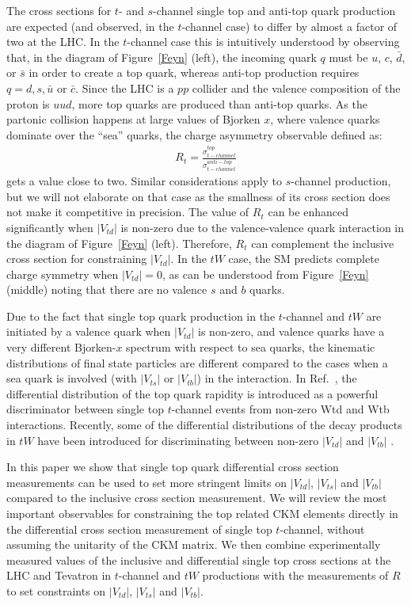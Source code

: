 \documentclass[11pt]{article}
\newcommand{\VTD}{|V_{td}|}
\newcommand{\VTS}{|V_{ts}|}
\newcommand{\VTB}{|V_{tb}|}
\begin{document}
The  cross sections for $t$- and $s$-channel single top and anti-top quark production are expected (and observed, in the $t$-channel case) to differ by almost a factor of two at the LHC.
In the $t$-channel case this is intuitively understood by observing that, in the diagram of Figure~\ref{Feyn} (left), the incoming  quark $q$ must be $u$, $c$, $\bar{d}$, or $\bar{s}$  in order to create a top quark, whereas anti-top  production requires $q = d, s, \bar{u}$ or $\bar{c}$. Since the LHC is a $pp$ collider and the valence composition of the proton is $uud$, more top quarks are produced than anti-top quarks. As the partonic collision happens at large values of Bjorken $x$, where valence quarks dominate over the ``sea'' quarks, the charge asymmetry observable defined as:
\begin{eqnarray}\label{Eq:rt}
R_{t} = \frac{\sigma_{t-channel}^{top}}{\sigma_{t-channel}^{anti-top}}
\end{eqnarray}
gets a value close to two.
Similar considerations apply to $s$-channel production, but we will not elaborate on that case as the smallness of its cross section does not make it competitive in precision.
The value of $R_t$  can be enhanced significantly when $\VTD$ is  non-zero due to the valence-valence quark interaction in the diagram of Figure~\ref{Feyn} (left). Therefore, $R_t$ can complement the inclusive cross section for constraining $\VTD$.
In the $tW$ case, the SM predicts complete charge symmetry when $\VTD=0$, as can be understood from Figure~\ref{Feyn} (middle) noting that there are no valence $s$ and $b$ quarks.

Due to the fact that single top quark production in the $t$-channel and $tW$ are initiated by a valence quark when $\VTD$ is non-zero, and valence quarks have a very different Bjorken-$x$ spectrum with respect to sea quarks, the kinematic distributions of final state particles are different compared to the cases when a sea quark is involved (with $\VTS$ or $\VTB$) in the interaction. In Ref.~\cite{AguilarSaavedra:2010wf}, the differential distribution of the top quark rapidity is introduced as a powerful discriminator between single top $t$-channel events from non-zero Wtd and Wtb interactions. Recently, some of the differential distributions of the decay products in $tW$ have been introduced for discriminating between non-zero $\VTD$ and $\VTB$ \cite{Alvarez:2017ybk}.



In this paper we show that single top quark differential cross section measurements can be used to set more stringent limits on $\VTD$, $\VTS$ and $\VTB$ compared to the inclusive cross section measurement. We will review the most important observables for constraining the top related CKM elements directly in the differential cross section measurement of single top $t$-channel, without assuming the unitarity of the CKM matrix. We then combine experimentally measured values of the inclusive and differential single top cross sections at the LHC and Tevatron in $t$-channel and $tW$ productions with the measurements of $R$ to set constraints on $\VTD$, $\VTS$ and $\VTB$.
\end{document}
